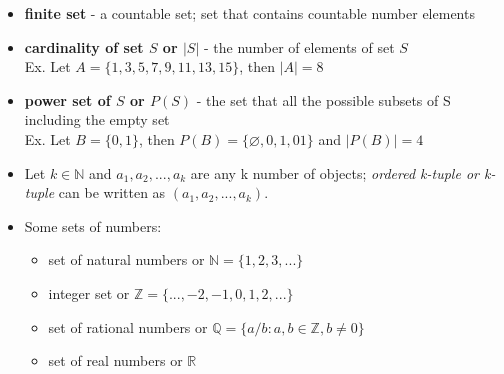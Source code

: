 \begin{itemize}
	\item \textbf{finite set} - a countable set; set that contains countable number elements
	
 	\item  \textbf{cardinality of set $S$ or $|S|$} - the number of elements of set $S$\\
 	Ex. Let $A=\{1,3,5,7,9,11,13,15\}$, then $|A|=8$
 	
 	\item \textbf{power set of $S$ or $P(S)$} - the set that all the possible subsets of S including the empty set\\
 	Ex. Let $B=\{0,1\}$, then $P(B)=\{\varnothing,0,1,01\}$ and $|P(B)|=4$
 	
 	\item Let $k \in \mathbb{N}$ and $a_1,a_2,...,a_k$ are any k number of objects; \textit{ordered k-tuple or k-tuple} can be written as $(a_1,a_2,...,a_k)$.
 	\item Some sets of numbers:
 	\begin{itemize}
 		\item set of natural numbers or $\mathbb{N} = \{1,2,3,...\}$
 		\item integer set or $\mathbb{Z} = \{...,-2,-1,0,1,2,...\}$
 		\item set of rational numbers or $\mathbb{Q} = \{a/b:a,b \in \mathbb{Z},b\neq 0 \}$
 		\item set of real numbers or $\mathbb{R}$
 	\end{itemize}
\end{itemize}

